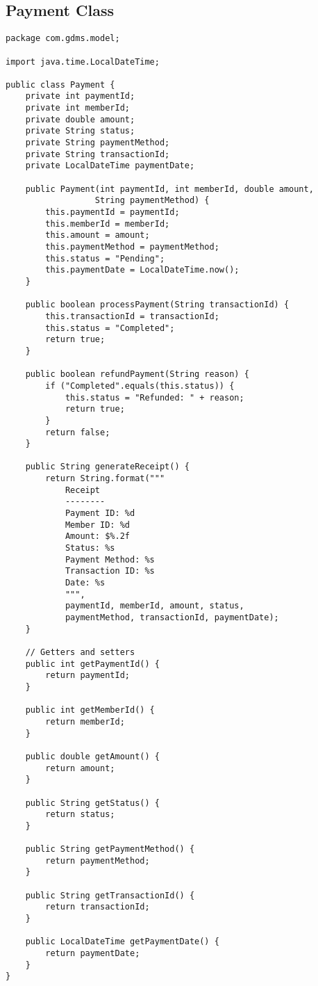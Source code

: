 \documentclass[12pt,a4paper]{report}
\begin{document}
\subsection{Payment Class}
\begin{lstlisting}[caption=Payment.java]
package com.gdms.model;

import java.time.LocalDateTime;

public class Payment {
    private int paymentId;
    private int memberId;
    private double amount;
    private String status;
    private String paymentMethod;
    private String transactionId;
    private LocalDateTime paymentDate;

    public Payment(int paymentId, int memberId, double amount, 
                  String paymentMethod) {
        this.paymentId = paymentId;
        this.memberId = memberId;
        this.amount = amount;
        this.paymentMethod = paymentMethod;
        this.status = "Pending";
        this.paymentDate = LocalDateTime.now();
    }

    public boolean processPayment(String transactionId) {
        this.transactionId = transactionId;
        this.status = "Completed";
        return true;
    }

    public boolean refundPayment(String reason) {
        if ("Completed".equals(this.status)) {
            this.status = "Refunded: " + reason;
            return true;
        }
        return false;
    }

    public String generateReceipt() {
        return String.format("""
            Receipt
            --------
            Payment ID: %d
            Member ID: %d
            Amount: $%.2f
            Status: %s
            Payment Method: %s
            Transaction ID: %s
            Date: %s
            """,
            paymentId, memberId, amount, status,
            paymentMethod, transactionId, paymentDate);
    }

    // Getters and setters
    public int getPaymentId() {
        return paymentId;
    }

    public int getMemberId() {
        return memberId;
    }

    public double getAmount() {
        return amount;
    }

    public String getStatus() {
        return status;
    }

    public String getPaymentMethod() {
        return paymentMethod;
    }

    public String getTransactionId() {
        return transactionId;
    }

    public LocalDateTime getPaymentDate() {
        return paymentDate;
    }
}
\end{lstlisting}
\end{document}
